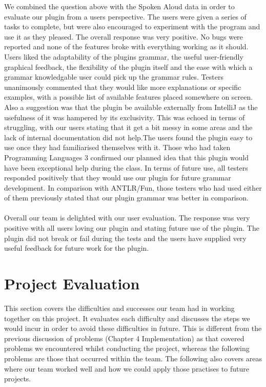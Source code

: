 We combined the question above with the Spoken Aloud data in order to evaluate our plugin from a users perspective. The users were given a series of tasks to complete, but were also encouraged to experiment with the program and use it as they pleased. The overall response was very positive. No bugs were reported and none of the features broke with everything working as it should. Users liked the adaptability of the plugins grammar, the useful user-friendly graphical feedback, the flexibility of the plugin itself and the ease with which a grammar knowledgable user could pick up the grammar rules. Testers unanimously commented that they would like more explanations or specific examples, with a possible list of available features placed somewhere on screen. Also a suggestion was that the plugin be available externally from IntelliJ as the usefulness of it was hampered by its exclusivity. This was echoed in terms of struggling, with our users stating that it get a bit messy in some areas and the lack of internal documentation did not help.The users found the plugin easy to use once they had familiarised themselves with it. Those who had taken Programming Languages 3 confirmed our planned idea that this plugin would have been exceptional help during the class. In terms of future use, all testers responded positively that they would use our plugin for future grammar development. In comparison with ANTLR/Fun, those testers who had used either of them previously stated that our plugin grammar was better in comparison. \\
\\
Overall our team is delighted with our user evaluation. The response was very positive with all users loving our plugin and stating future use of the plugin. The plugin did not break or fail during the tests and the users have supplied very useful feedback for future work for the plugin. 
\\
\section{Project Evaluation}
This section covers the difficulties and successes our team had in working together on this project. It evaluates each difficulty and discusses the steps we would incur in order to avoid these difficulties in future. This is different from the previous discussion of problems (Chapter 4 Implementation) as that covered problems we encountered whilst conducting the project, whereas the following problems are those that occurred within the team. The following also covers areas where our team worked well and how we could apply those practises to future projects.  \\
\\
